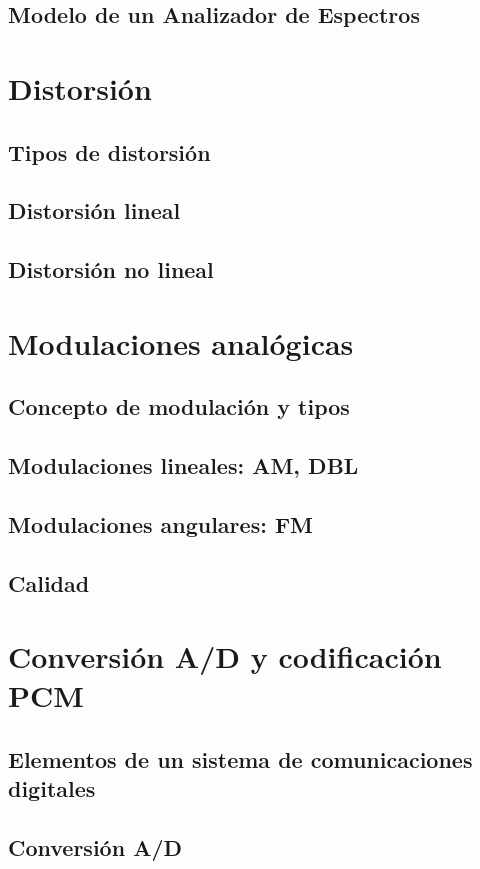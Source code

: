\documentclass[a4paper]{book}
\begin{document}
\section{Modelo de un Analizador de Espectros}

\chapter{Distorsión}
\section{Tipos de distorsión}
\section{Distorsión lineal}
\section{Distorsión no lineal}

\chapter{Modulaciones analógicas}
\section{Concepto de modulación y tipos}
\section{Modulaciones lineales: AM, DBL}
\section{Modulaciones angulares: FM}
\section{Calidad}

\chapter{Conversión A/D y codificación PCM}
\section{\texorpdfstring{Elementos de un sistema de comunicaciones\\ digitales}{Elementos de un sistema de comunicaciones digitales}}
\section{Conversión A/D}
\end{document}
